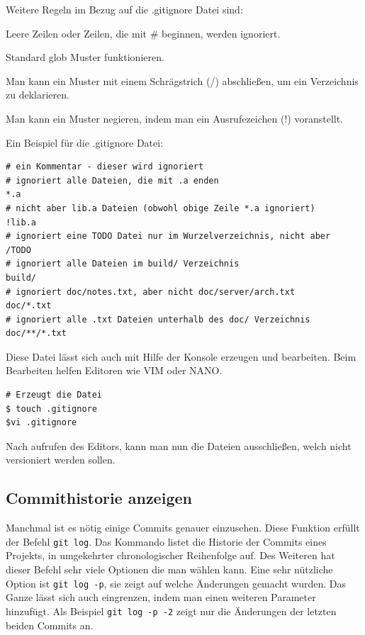 \documentclass[12pt,a4paper,bibliography=totocnumbered,listof=totocnumbered]{scrartcl}
\begin{document}
Weitere Regeln im Bezug auf die .gitignore Datei sind:

\begin{compactitem}
	\item Leere Zeilen oder Zeilen, die mit \# beginnen, werden 			     ignoriert.
	\item Standard glob Muster funktionieren.
	\item Man kann ein Muster mit einem Schrägstrich (/) abschließen, um ein Verzeichnis zu deklarieren.
	\item  Man kann ein Muster negieren, indem man ein Ausrufezeichen (!) voranstellt.
\end{compactitem}

Ein Beispiel für die .gitignore Datei:
\vspace{1em}
\begin{lstlisting}[caption=Git Einstellungen der.gitignore Datei, label=lst:arduino]
# ein Kommentar - dieser wird ignoriert
# ignoriert alle Dateien, die mit .a enden
*.a
# nicht aber lib.a Dateien (obwohl obige Zeile *.a ignoriert)
!lib.a
# ignoriert eine TODO Datei nur im Wurzelverzeichnis, nicht aber
/TODO
# ignoriert alle Dateien im build/ Verzeichnis
build/
# ignoriert doc/notes.txt, aber nicht doc/server/arch.txt
doc/*.txt
# ignoriert alle .txt Dateien unterhalb des doc/ Verzeichnis
doc/**/*.txt
\end{lstlisting}

Diese Datei lässt sich auch mit Hilfe der Konsole erzeugen und bearbeiten. Beim Bearbeiten helfen Editoren wie VIM oder NANO. 
\vspace{1em}
\begin{lstlisting}[caption=Erstellen der.gitignore Datei, label=lst:arduino]
# Erzeugt die Datei 
$ touch .gitignore
$vi .gitignore
\end{lstlisting}

Nach aufrufen des Editors, kann man nun die Dateien ausschließen, welch nicht versioniert werden sollen.
 

\subsection{Commithistorie anzeigen}
Manchmal ist es nötig einige Commits genauer einzusehen. Diese Funktion erfüllt der Befehl  \lstinline|git log|. Das Kommando listet die Historie der Commits eines Projekts, in umgekehrter chronologischer Reihenfolge auf. Des Weiteren hat dieser Befehl sehr viele Optionen die man wählen kann. Eine sehr nützliche Option ist \lstinline|git log -p|, sie zeigt auf welche Änderungen gemacht wurden. Das Ganze lässt sich auch eingrenzen, indem man einen weiteren Parameter hinzufügt. Als Beispiel \lstinline|git log -p -2| zeigt nur die Änderungen der letzten beiden Commits an.
\end{document}
